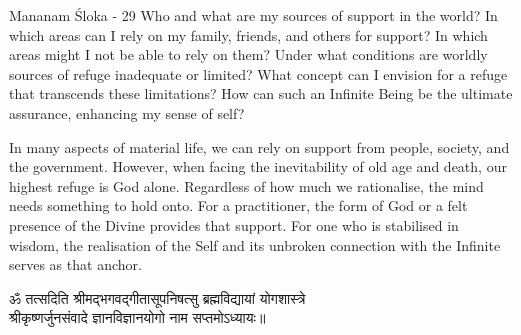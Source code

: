 
\newpage
\begin{mananam}{\mananamfont Mananam Śloka - 29}
\normalfont\mananamtext Who and what are my sources of support in the world? In which areas can I rely on my family, friends, and others for support? In which areas might I not be able to rely on them? Under what conditions are worldly sources of refuge inadequate or limited? What concept can I envision for a refuge that transcends these limitations? How can such an Infinite Being be the ultimate assurance, enhancing my sense of self?
\end{mananam}
\sreflect 
\begin{inspiration}{}
\normalfont\mananamtext In many aspects of material life, we can rely on support from people, society, and the government. However, when facing the inevitability of old age and death, our highest refuge is God alone. Regardless of how much we rationalise, the mind needs something to hold onto. For a practitioner, the form of God or a felt presence of the Divine provides that support. For one who is stabilised in wisdom, the realisation of the Self and its unbroken connection with the Infinite serves as that anchor.
\end{inspiration}
\newpage

\begin{center}
\devfont ॐ तत्सदिति श्रीमद्भगवद्गीतासूपनिषत्सु  ब्रह्मविद्यायां योगशास्त्रे\\ श्रीकृष्णर्जुनसंवादे ज्ञानविज्ञानयोगो  नाम सप्तमोऽध्यायः॥\\
\end{center}